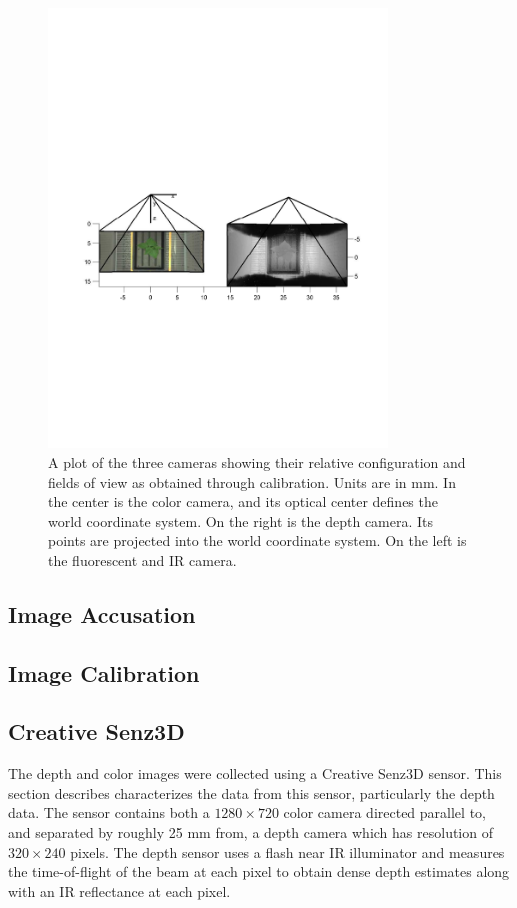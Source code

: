 

\begin{figure}
  \includegraphics[width=9cm,trim=20 240 20 300,clip]{Figures/CameraConfiguration}
\caption{A plot of the three cameras showing their relative configuration and fields of view as obtained through calibration.  Units are in mm.  In the center is the color camera, and its optical center defines the world coordinate system.  On the right is the depth camera.  Its points are projected into the world coordinate system.  On the left is the fluorescent and IR camera.}
\label{fig:CameraConfiguration}
\end{figure}

\subsection{Image Accusation}

\subsection{Image Calibration}

\subsection{Creative Senz3D}

The depth and color images were collected using a Creative Senz3D sensor.
This section describes characterizes the data from this sensor, particularly the depth data.
The sensor contains both a $1280 \times 720$ color camera directed parallel to, and separated by roughly 25 mm from, a depth camera which has resolution of $320\times240$ pixels.
The depth sensor uses a flash near IR illuminator and measures the time-of-flight of the beam at each pixel to obtain dense depth estimates along with an IR reflectance at each pixel.

